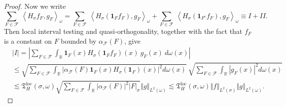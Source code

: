 \documentclass[10pt,a4paper]{amsart}
\begin{document}
\begin{proof}
Now we write%
\[
\sum_{F\in\mathcal{F}}\ \left\langle H_{\sigma}f_{F},g_{F}\right\rangle
_{\omega}=\sum_{F\in\mathcal{F}}\ \left\langle H_{\sigma}\left(
\mathbf{1}_{F}f_{F}\right)  ,g_{F}\right\rangle _{\omega}+\sum_{F\in
\mathcal{F}}\ \left\langle H_{\sigma}\left(  \mathbf{1}_{F^{c}}f_{F}\right)
,g_{F}\right\rangle _{\omega}\equiv I+II.
\]
Then local interval testing and quasi-orthogonality, together with the fact
that $f_{F}$ is a constant on $F$ bounded by $\alpha_{\mathcal{F}}\left(
F\right)  $, give%
\begin{align*}
& \left\vert I\right\vert =\left\vert \sum_{F\in\mathcal{F}}\int_{\mathbb{R}%
}\mathbf{1}_{F}\left(  x\right)  H_{\sigma}\left(  \mathbf{1}_{F}f_{F}\right)
\left(  x\right)  \ g_{F}\left(  x\right)  \ d\omega\left(  x\right)
\right\vert \\
& \leq\sqrt{\sum_{F\in\mathcal{F}}\int_{\mathbb{R}}\left\vert \alpha
_{\mathcal{F}}\left(  F\right)  \mathbf{1}_{F}\left(  x\right)  H_{\sigma
}\left(  \mathbf{1}_{F}\right)  \left(  x\right)  \right\vert ^{2}%
d\omega\left(  x\right)  }\ \sqrt{\sum_{F\in\mathcal{F}}\int_{\mathbb{R}%
}\left\vert g_{F}\left(  x\right)  \right\vert ^{2}d\omega\left(  x\right)
}\\
& \lesssim\mathfrak{T}_{H}^{\operatorname{loc}}\left(  \sigma,\omega\right)
\sqrt{\sum_{F\in\mathcal{F}}\int_{\mathbb{R}}\left\vert \alpha_{\mathcal{F}%
}\left(  F\right)  \right\vert ^{2}\left\vert F\right\vert _{\sigma}%
}\left\Vert g\right\Vert _{L^{2}\left(  \omega\right)  }\lesssim
\mathfrak{T}_{H}^{\operatorname{loc}}\left(  \sigma,\omega\right)  \left\Vert
f\right\Vert _{L^{2}\left(  \sigma\right)  }\left\Vert g\right\Vert
_{L^{2}\left(  \omega\right)  }.
\end{align*}



\end{proof}
\end{document}
